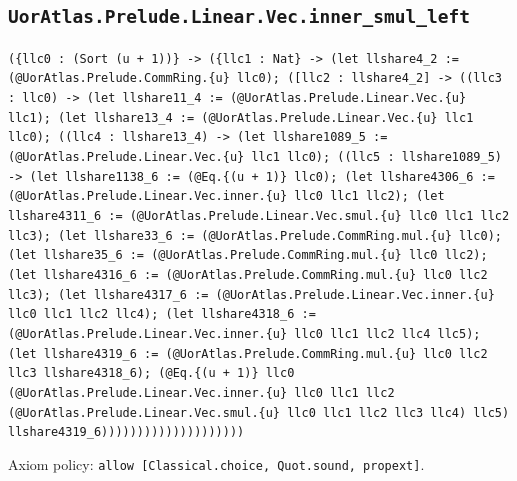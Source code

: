 \documentclass[11pt]{article}
\begin{document}
\subsection*{\texttt{UorAtlas.Prelude.Linear.Vec.inner\_smul\_left}}
\noindent\texttt{(\{llc0 : (Sort (u + 1))\} -> (\{llc1 : Nat\} -> (let llshare4\_2 := (@UorAtlas.Prelude.CommRing.\{u\} llc0); ([llc2 : llshare4\_2] -> ((llc3 : llc0) -> (let llshare11\_4 := (@UorAtlas.Prelude.Linear.Vec.\{u\} llc1); (let llshare13\_4 := (@UorAtlas.Prelude.Linear.Vec.\{u\} llc1 llc0); ((llc4 : llshare13\_4) -> (let llshare1089\_5 := (@UorAtlas.Prelude.Linear.Vec.\{u\} llc1 llc0); ((llc5 : llshare1089\_5) -> (let llshare1138\_6 := (@Eq.\{(u + 1)\} llc0); (let llshare4306\_6 := (@UorAtlas.Prelude.Linear.Vec.inner.\{u\} llc0 llc1 llc2); (let llshare4311\_6 := (@UorAtlas.Prelude.Linear.Vec.smul.\{u\} llc0 llc1 llc2 llc3); (let llshare33\_6 := (@UorAtlas.Prelude.CommRing.mul.\{u\} llc0); (let llshare35\_6 := (@UorAtlas.Prelude.CommRing.mul.\{u\} llc0 llc2); (let llshare4316\_6 := (@UorAtlas.Prelude.CommRing.mul.\{u\} llc0 llc2 llc3); (let llshare4317\_6 := (@UorAtlas.Prelude.Linear.Vec.inner.\{u\} llc0 llc1 llc2 llc4); (let llshare4318\_6 := (@UorAtlas.Prelude.Linear.Vec.inner.\{u\} llc0 llc1 llc2 llc4 llc5); (let llshare4319\_6 := (@UorAtlas.Prelude.CommRing.mul.\{u\} llc0 llc2 llc3 llshare4318\_6); (@Eq.\{(u + 1)\} llc0 (@UorAtlas.Prelude.Linear.Vec.inner.\{u\} llc0 llc1 llc2 (@UorAtlas.Prelude.Linear.Vec.smul.\{u\} llc0 llc1 llc2 llc3 llc4) llc5) llshare4319\_6))))))))))))))))))))}\par
\noindent Axiom policy: \texttt{allow [Classical.choice, Quot.sound, propext]}.\par
\end{document}
